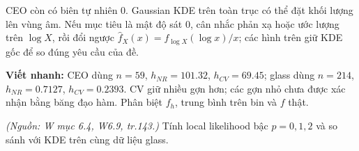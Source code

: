 \begin{solution}
CEO còn có biên tự nhiên $0$. Gaussian KDE trên toàn trục có thể đặt khối lượng lên vùng âm. Nếu mục tiêu là mật độ sát 0, cân nhắc phản xạ hoặc ước lượng trên $\log X$, rồi đổi ngược $\widehat f_X(x)=\widehat f_{\log X}(\log x)/x$; các hình trên giữ KDE gốc để so đúng yêu cầu của đề.
\par\textbf{Viết nhanh:} CEO dùng $n=59$, $h_{NR}=101.32$, $h_{CV}=69.45$; glass dùng $n=214$, $h_{NR}=0.7127$, $h_{CV}=0.2393$. CV giữ nhiều gợn hơn; các gợn nhỏ chưa được xác nhận bằng băng đạo hàm. Phân biệt $f_h$, trung bình trên bin và $f$ thật.
\end{solution}

\begin{problem}\label{k:42}
\textit{(Nguồn: W mục 6.4, W6.9, tr.143.)} Tính local likelihood bậc $p=0,1,2$ và so sánh với KDE trên cùng dữ liệu glass.
\end{problem}

